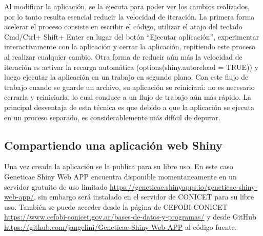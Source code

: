 Al modificar la aplicación, se la ejecuta para poder ver los cambios realizados, por lo tanto resulta esencial reducir la velocidad de iteración. La primera forma acelerar el proceso consiste en escribir el código, utilizar el atajo del teclado Cmd/Ctrl+ Shift+ Enter en lugar del botón ``Ejecutar aplicación'', experimentar interactivamente con la aplicación y cerrar la aplicación, repitiendo este proceso al realizar cualquier cambio. Otra forma de reducir aún más la velocidad de iteración es activar la recarga automática (options(shiny.autoreload = TRUE)) y luego ejecutar la aplicación en un trabajo en segundo plano. Con este flujo de trabajo cuando se guarde un archivo, su aplicación se reiniciará: no es necesario cerrarla y reiniciarla, lo cual conduce a un flujo de trabajo aún más rápido. La principal desventaja de esta técnica es que debido a que la aplicación se ejecuta en un proceso separado, es considerablemente más difícil de depurar.


\subsection{Compartiendo una aplicación web Shiny}

Una vez creada la aplicación se la publica para su libre uso. En este caso Geneticae Shiny Web APP encuentra disponible momentaneamente en un servidor gratuito de uso limitado \url{https://geneticae.shinyapps.io/geneticae-shiny-web-app/}, sin embargo será instalado en el servidor de CONICET para su libre uso. También se puede acceder desde la página de CEFOBI-CONICET \url{https://www.cefobi-conicet.gov.ar/bases-de-datos-y-programas/} y desde GitHub \url{https://github.com/jangelini/Geneticae-Shiny-Web-APP} al código fuente.
